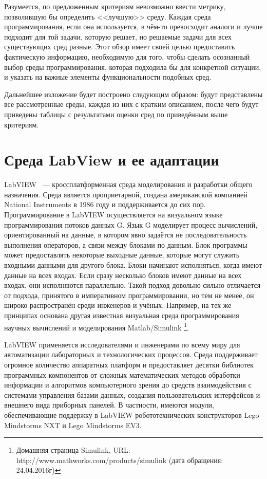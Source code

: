 \documentclass[a5paper]{article}
\begin{document}
Разумеется, по предложенным критериям невозможно ввести метрику, позволившую бы определить <<лучшую>> среду. 
Каждая среда программирования, если она используется, в чём-то превосходит аналоги и лучше подходит для той 
задачи, которую решает, но решаемые задачи для всех существующих сред разные. Этот обзор имеет своей целью 
предоставить фактическую информацию, необходимую для того, чтобы сделать осознанный выбор среды 
программирования, которая подходила бы для конкретной ситуации, и указать на важные элементы функциональности 
подобных сред.

Дальнейшее изложение будет построено следующим образом: будут представлены все рассмотренные среды, 
каждая из них с кратким описанием, после чего будут приведены таблицы с результатами оценки сред 
по приведённым выше критериям.

\section{Среда LabView и ее адаптации}

LabVIEW~\cite{kodosky1991visual} --- кроссплатформенная среда моделирования и разработки общего назначения. 
Среда является проприетарной, 
создана американской компанией National Instruments в 1986 году и поддерживается до сих пор. Программирование 
в LabVIEW осуществляется на визуальном языке программирования потоков данных G. Язык G моделирует процесс 
вычислений, ориентированный на данные, в котором явно задаётся не последовательность выполнения операторов, 
а связи между блоками по данным. Блок программы может предоставлять некоторые выходные данные, которые могут 
служить входными данными для другого блока. Блоки начинают исполняться, когда имеют данные на всех входах. 
Если сразу несколько блоков имеют данные на всех входах, они исполняются параллельно. Такой подход довольно 
сильно отличается от подхода, принятого в императивном программировании, но тем не менее, он широко 
распространён среди инженеров и учёных. Например, на тех же принципах основана другая известная визуальная 
среда программирования научных вычислений и моделирования Matlab/Simulink%
\footnote{Домашняя страница Simulink, URL: http://www.mathworks.com/products/simulink (дата обращения: 24.04.2016г)}.

LabVIEW применяется исследователями и инженерами по всему миру для автоматизации лабораторных и технологических 
процессов. Среда поддерживает огромное количество аппаратных платформ и предоставляет десятки библиотек 
программных компонентов от сложных математических методов обработки информации и алгоритмов компьютерного 
зрения до средств взаимодействия с системами управления базами данных, создания пользовательских интерфейсов 
и внешнего вида приборных панелей. В частности, имеются модули, обеспечивающие поддержку в LabVIEW 
робототехнических конструкторов Lego Mindstorms NXT и Lego Mindstorms EV3.
\end{document}
